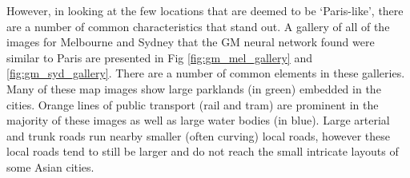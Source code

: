 \documentclass[10pt,letterpaper]{article}
\begin{document}
However, in looking at the few locations that are deemed to be `Paris-like', there are a number of common characteristics that stand out. A gallery of all of the images for Melbourne and Sydney that the GM neural network found were similar to Paris are presented in Fig \ref{fig:gm_mel_gallery} and \ref{fig:gm_syd_gallery}. There are a number of common elements in these galleries. Many of these map images show large parklands (in green) embedded in the cities. Orange lines of public transport (rail and tram) are prominent in the majority of these images as well as large water bodies (in blue). Large arterial and trunk roads run nearby smaller (often curving) local roads, however these local roads tend to still be larger and do not reach the small intricate layouts of some Asian cities.
\end{document}
